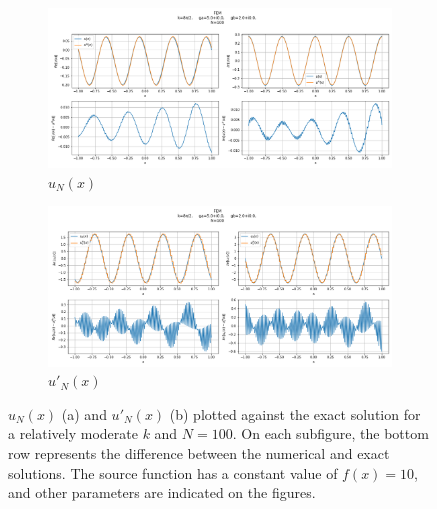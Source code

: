 \begin{figure}[h!]
    \centering
    \begin{subfigure}[b]{0.7\textwidth}
        \includegraphics[width=\textwidth]{img/FEM-Const-MidFreq-N0100-sol.png}
        \caption{$u_N(x)$}
    \end{subfigure}
    \vfill
    \begin{subfigure}[b]{0.7\textwidth}
        \includegraphics[width=\textwidth]{img/FEM-Const-MidFreq-N0100-der.png}
        \caption{$u'_N(x)$}
    \end{subfigure}
    \caption{$u_N(x)$ (a) and $u'_N(x)$ (b) plotted against the exact solution for a relatively moderate $k$ and $N=100$. On each subfigure, the bottom row represents the difference between the numerical and exact solutions. The source function has a constant value of $f(x)=10$, and other parameters are indicated on the figures.}
    \label{fig:femMidfreqN100}
\end{figure}

